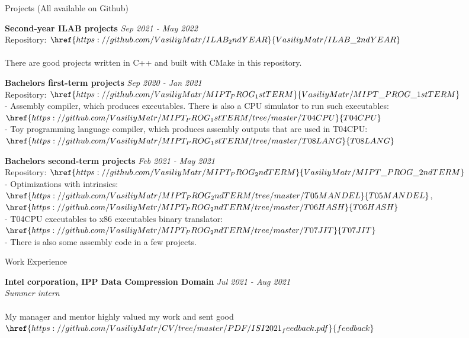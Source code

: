 \documentclass{resume} %
\begin{document}
\begin{rSection}{Projects (All available on Github)}

{\bf Second-year ILAB projects} \hfill {\em Sep 2021 - May 2022}
\\ {Repository: $\href {https://github.com/VasiliyMatr/ILAB_2ndYEAR}
    {VasiliyMatr/ILAB\_2ndYEAR}$}
\\
\\ There are good projects written in C++ and built with CMake in this repository.

{\bf Bachelors first-term projects} \hfill {\em Sep 2020 - Jan 2021}
\\ Repository: $\href {https://github.com/VasiliyMatr/MIPT_PROG_1stTERM}
    {VasiliyMatr/MIPT\_PROG\_1stTERM}$
\\- Assembly compiler, which produces executables. There is also a CPU simulator to run
    such executables:
    $\href {https://github.com/VasiliyMatr/MIPT_PROG_1stTERM/tree/master/T04CPU}{T04CPU}$
\\- Toy programming language compiler, which produces assembly outputs that are used in
    T04CPU:
    $\href {https://github.com/VasiliyMatr/MIPT_PROG_1stTERM/tree/master/T08LANG}{T08LANG}$


{\bf Bachelors second-term projects} \hfill {\em Feb 2021 - May 2021}
\\ Repository: $\href {https://github.com/VasiliyMatr/MIPT_PROG_2ndTERM}
    {VasiliyMatr/MIPT\_PROG\_2ndTERM}$
\\- Optimizations with intrinsics:
    $\href {https://github.com/VasiliyMatr/MIPT_PROG_2ndTERM/tree/master/T05MANDEL}{T05MANDEL}$,
    $\href {https://github.com/VasiliyMatr/MIPT_PROG_2ndTERM/tree/master/T06HASH}{T06HASH}$
\\- T04CPU executables to x86 executables binary translator:
    $\href {https://github.com/VasiliyMatr/MIPT_PROG_2ndTERM/tree/master/T07JIT}{T07JIT}$
\\- There is also some assembly code in a few projects.
\end{rSection}

\begin{rSection}{Work Experience}

{\bf Intel corporation, IPP Data Compression Domain} \hfill {\em Jul 2021 - Aug 2021}
\\{\textit{ Summer intern}}
\\
\\ My manager and mentor highly valued my work and sent good
    $\href {https://github.com/VasiliyMatr/CV/tree/master/PDF/ISI2021_feedback.pdf}{feedback}$

\end{rSection}
\end{document}
